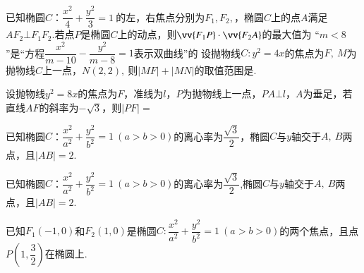 \documentclass{BHCexam}
\begin{document}
\begin{questions}
\qs 已知椭圆$C$：$\dfrac{x^2}{4}+\dfrac{y^2}{3}=1~$的左，右焦点分别为$ F_1,F_2 ,$，椭圆$C$上的点$ A $满足$ AF_2\bot F_1F_2. $若点$ P $是椭圆$C$上的动点，则$ \vv{F_1P}\cdot\vv{F_2A} $的最大值为\xx
{}
\qs“$ m<8 $”是“方程$\dfrac{x^2}{m-10}-\dfrac{y^2}{m-8}=1$表示双曲线”的\xx
\qs 设抛物线$ C:y^2=4x $的焦点为$ F,~ $$ M $为抛物线$ C $上一点，$ N(2,2) ,~$则$ \left|MF \right|+\left| MN\right|$的取值范围是\tk.

\qs 设抛物线$ y^2=8x $的焦点为$ F $，准线为$ l $，$ P $为抛物线上一点，$ PA\bm{\bot} l $，$ A $为垂足，若直线$ AF $的斜率为$ -\sqrt{3} $，则$ \left|PF\right|= $\xx
{}

\newpage
\qs  


\qs 已知椭圆$C$：$\dfrac{x^2}{a^2}+\dfrac{y^2}{b^2}=1~(a>b>0)$的离心率为$ \dfrac{\sqrt{3}}{2} $，椭圆$C$与$ y $轴交于$ A,~B $两点，且$ \left|AB\right|=2 $.
\kongbai
\qs 已知椭圆$C$：$\dfrac{x^2}{a^2}+\dfrac{y^2}{b^2}=1~(a>b>0)$的离心率为$ \dfrac{\sqrt{3}}{2} $,椭圆$C$与$ y $轴交于$ A,~B $两点，且$ \left|AB\right|=2$.
\kongbai
\qs 已知$F_1\left(-1,0\right)$和$ F_2\left(1,0\right) $是椭圆$C:\dfrac{x^2}{a^2}+\dfrac{y^2}{b^2}=1~(a>b>0)$的两个焦点，且点$ P\left(1,\dfrac{3}{2}\right) $在椭圆上.
\begin{parts}

\end{parts}
\end{questions}
\end{document}
